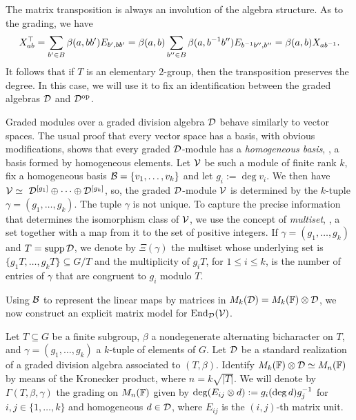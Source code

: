\begin{remark}\label{rmk:2-grp-transp}
	The matrix transposition is always an involution of the algebra structure. As to the grading, we have
	\[
	X_{ab}^{\top} = \sum_{b'\in B} \beta(a, bb') E_{b',bb'}
	   = \beta(a,b) \sum_{b''\in B} \beta(a, b^{-1}b'') E_{b^{-1}b'', b''} = \beta(a,b) X_{ab^{-1}}.
	\]
	It follows that if $T$ is an elementary 2-group, then the transposition preserves the degree. 
	In this case, we will use it to fix an identification between the graded algebras $\mathcal{D}$ and $\mathcal{D}^{\mathrm{op}}$.
\end{remark}



Graded modules over a graded division algebra $\mathcal D$ behave similarly to vector spaces. The usual proof that every vector space has a basis, with obvious modifications, shows that every graded $\mathcal D$-module has a \emph{homogeneous basis}, \ie, a basis formed by homogeneous elements.
Let $\mathcal V$ be such a module of finite rank $k$, fix a homogeneous basis $\mathcal B = \{v_1, \ldots, v_k\}$ and let $g_i := \operatorname{deg} v_i$. We then have $\mc{V}\iso \ \D^{[g_1]}\oplus\cdots\oplus\D^{[g_k]}$, so, the graded $\mathcal D$-module $\mathcal V$ is determined by the $k$-tuple $\gamma = (g_1,\ldots, g_k)$. The tuple $\gamma$ is not unique. To capture the precise information that determines the isomorphism class of $\mathcal V$, we use the concept of \emph{multiset}, \ie, a set together with a map from it to the set of positive integers. If $\gamma = (g_1,\ldots, g_k)$ and $T=\operatorname{supp} \mathcal{D}$, we denote by $\Xi(\gamma)$ the multiset whose underlying set is $\{g_1 T,\ldots, g_k T\} \subseteq G/T$ and the multiplicity of $g_i T$, for $1\leq i\leq k$, is the number of entries of $\gamma$ that are congruent to $g_i$ modulo $T$.

Using $\mathcal B$ to represent the linear maps by matrices in $M_k(\mathcal{D}) = M_k(\mathbb{F})\otimes \mathcal{D}$, we now construct an explicit matrix model for $\operatorname{End}_{\mathcal{D}}(\mathcal V)$.

\begin{defi}\label{def:explicit-grd-assoc}
	Let $T \subseteq G$ be a finite subgroup, $\beta$ a nondegenerate alternating bicharacter on $T$, and $\gamma = (g_1, \ldots, g_k)$ a $k$-tuple of elements of $G$. Let $\mathcal{D}$ be a standard realization of a graded division algebra associated to $(T, \beta)$. Identify $M_k(\mathbb{F})\otimes \mathcal{D} \simeq M_n(\mathbb{F})$ by means of the Kronecker product, where $n=k\sqrt{|T|}$. We will denote by $\Gamma(T, \beta, \gamma)$ the grading on $M_n(\mathbb{F})$ given by $\deg (E_{ij} \otimes d) := g_i (\deg d) g_j^{-1}$ for $i,j\in \{1, \ldots , k\}$ and homogeneous $d\in \mathcal{D}$, where $E_{ij}$ is the $(i,j)$-th matrix unit.
\end{defi}

